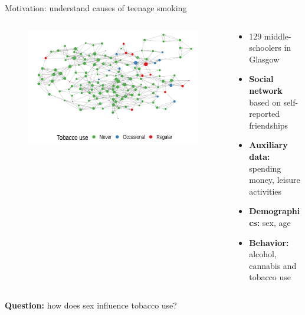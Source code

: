 \documentclass[aspectratio=169]{beamer}
\theoremstyle{remark}
\begin{document}
\begin{frame}{Motivation: understand causes of teenage smoking \citep{michell1996}}
    \begin{columns}
        \centering
        \begin{column}{0.55\textwidth}
            \begin{figure}
                \centering
                \includegraphics[width=1.05\textwidth]{figures/glasgow/tobacco.png}
            \end{figure}
        \end{column}
        \begin{column}{0.5\textwidth}
            \begin{itemize}
                \item 129 middle-schoolers in Glasgow
                \item {\bf Social network} based on self-reported friendships
                \item {\bf Auxiliary data:} spending money, leisure activities
                \item {\bf Demographics:} sex, age
                \item {\bf Behavior:} alcohol, cannabis and tobacco use
            \end{itemize}
        \end{column}
    \end{columns}
    \vspace{2mm}
    \pause
    \centering
    \textbf{Question:} how does sex influence tobacco use?
\end{frame}
\end{document}
